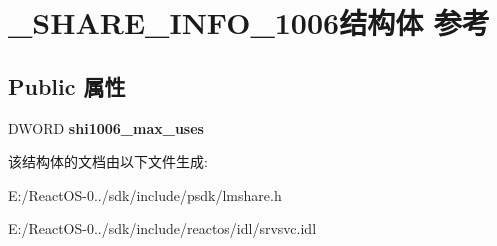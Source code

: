 \hypertarget{struct___s_h_a_r_e___i_n_f_o__1006}{}\section{\+\_\+\+S\+H\+A\+R\+E\+\_\+\+I\+N\+F\+O\+\_\+1006结构体 参考}
\label{struct___s_h_a_r_e___i_n_f_o__1006}
\subsection*{Public 属性}
\begin{DoxyCompactItemize}
\item 
\mbox{\label{struct___s_h_a_r_e___i_n_f_o__1006_ad3273f23de6e30e5ba1bcb840cda2acd}} 
D\+W\+O\+RD {\bfseries shi1006\+\_\+max\+\_\+uses}
\end{DoxyCompactItemize}


该结构体的文档由以下文件生成\+:\begin{DoxyCompactItemize}
\item 
E\+:/\+React\+O\+S-\/0../sdk/include/psdk/lmshare.\+h\item 
E\+:/\+React\+O\+S-\/0../sdk/include/reactos/idl/srvsvc.\+idl\end{DoxyCompactItemize}
